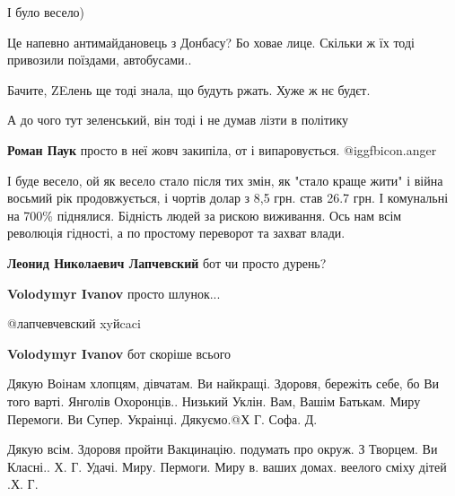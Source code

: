  
 
 
 
 

І було весело)

Це напевно антимайдановець з Донбасу? Бо ховае лице. Скільки ж їх тоді привозили поїздами, автобусами..

Бачите, ZEлень ще тоді знала, що будуть ржать. Хуже ж нє будєт.

А до чого тут зеленський, він тоді і не думав лізти в політику

\textbf{Роман Паук} просто в неї жовч закипіла, от і випаровується. @igg{fbicon.anger} 


І буде весело, ой як весело стало після тих змін, як "стало краще жити" і війна
восьмий рік продовжується, і чортів долар з 8,5 грн. став 26.7 грн. І
комунальні на 700\% піднялися. Бідність людей за рискою виживання. Ось нам всім
революція гідності, а по простому переворот та захват влади.

\begin{itemize} %
\textbf{Леонид Николаевич Лапчевский} бот чи просто дурень?

\textbf{Volodymyr Ivanov} просто шлунок...

@лапчевчевский xyйcaci

\textbf{Volodymyr Ivanov} бот скоріше всього
\end{itemize} %


Дякую Воінам хлопцям, дівчатам. Ви найкращі. Здоровя, бережіть себе, бо Ви того
варті. Янголів Охоронців.. Низький Уклін. Вам, Вашім Батькам. Миру Перемоги. Ви
Супер. Украінці. Дякуємо.@Х Г. Софа. Д.


Дякую всім. Здоровя пройти Вакцинацію. подумать про окруж. З Творцем. Ви
Класні.. Х. Г. Удачі. Миру. Пермоги. Миру в. ваших домах. веелого сміху дітей .Х. Г.

